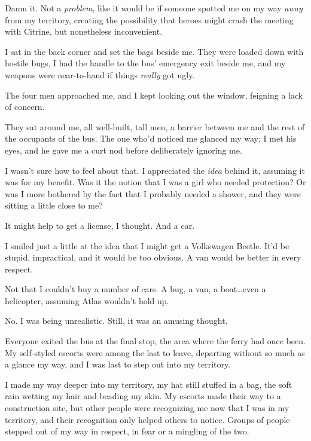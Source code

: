 Damn it.  Not a \emph{problem}, like it would be if someone spotted me on my way \emph{away} from my territory, creating the possibility that heroes might crash the meeting with Citrine, but nonetheless inconvenient.



I sat in the back corner and set the bags beside me.  They were loaded down with hostile bugs, I had the handle to the bus' emergency exit beside me, and my weapons were near-to-hand if things \emph{really} got ugly.



The four men approached me, and I kept looking out the window, feigning a lack of concern.



They sat around me, all well-built, tall men, a barrier between me and the rest of the occupants of the bus. The one who'd noticed me glanced my way; I met his eyes, and he gave me a curt nod before deliberately ignoring me.



I wasn't sure how to feel about that.  I appreciated the \emph{idea} behind it, assuming it was for my benefit.  Was it the notion that I was a girl who needed protection?  Or was I more bothered by the fact that I probably needed a shower, and they were sitting a little close to me?



It might help to get a license, I thought.  And a car.



I smiled just a little at the idea that I might get a Volkswagen Beetle.  It'd be stupid, impractical, and it would be too obvious.  A van would be better in every respect.



Not that I couldn't buy a number of cars.  A bug, a van, a boat\ldots even a helicopter, assuming Atlas wouldn't hold up.



No.  I was being unrealistic.  Still, it was an amusing thought.



Everyone exited the bus at the final stop, the area where the ferry had once been.  My self-styled escorts were among the last to leave, departing without so much as a glance my way, and I was last to step out into my territory.



I made my way deeper into my territory, my hat still stuffed in a bag, the soft rain wetting my hair and beading my skin.  My escorts made their way to a construction site, but other  people were recognizing me now that I was in my territory, and their recognition only helped others to notice.  Groups of people stepped out of my way in respect, in fear or a mingling of the two.



